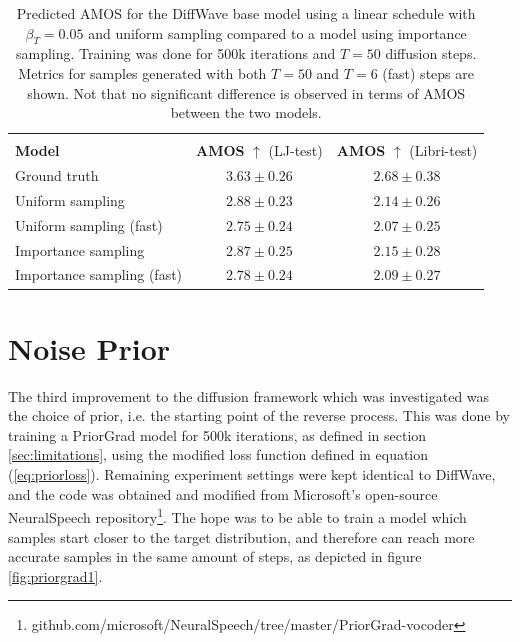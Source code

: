 \documentclass{report}
\begin{document}
\begin{table}[H]
\centering
\def\arraystretch{1.3}
\begin{tabular}{l | c | c }
\hline\hline
\vspace{-0.5cm} \\
\textbf{Model} & \textbf{AMOS} $\uparrow$ (LJ-test) & \textbf{AMOS} $\uparrow$ (Libri-test) \\ [0.5ex]
\hline
Ground truth  & $3.63 \pm 0.26$ & $ 2.68 \pm 0.38$ \\
\hline
Uniform sampling & $2.88 \pm 0.23$ & $ 2.14 \pm 0.26 $ \\
\hline
Uniform sampling (fast) & $2.75 \pm 0.24 $ & $2.07 \pm 0.25$ \\
\hline
Importance sampling & $2.87 \pm 0.25$ & $2.15 \pm 0.28$ \\
\hline
Importance sampling (fast) & $2.78 \pm 0.24 $ & $2.09 \pm 0.27$ \\
\hline\hline
\end{tabular}
\caption{\onehalfspacing Predicted AMOS for the DiffWave base model using a linear schedule with $\beta_T=0.05$ and uniform sampling compared to a model using importance sampling. Training was done for 500k iterations and $T=50$ diffusion steps. Metrics for samples generated with both $T=50$ and $T=6$ (fast) steps are shown. Not that no significant difference is observed in terms of AMOS between the two models.}
\label{table:weightamos}
\end{table}


\section{Noise Prior} \label{sec:noiseprior}

The third improvement to the diffusion framework which was investigated was the choice of prior, i.e. the starting point of the reverse process. This was done by training a PriorGrad model for 500k iterations, as defined in section \ref{sec:limitations}, using the modified loss function defined in equation (\ref{eq:priorloss}). Remaining experiment settings were kept identical to DiffWave, and the code was obtained and modified from Microsoft's open-source NeuralSpeech repository\footnote{github.com/microsoft/NeuralSpeech/tree/master/PriorGrad-vocoder}. The hope was to be able to train a model which samples start closer to the target distribution, and therefore can reach more accurate samples in the same amount of steps, as depicted in figure \ref{fig:priorgrad1}.
\end{document}
